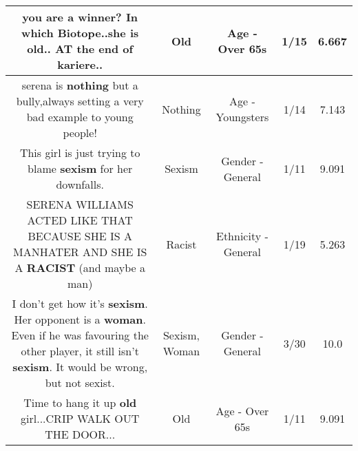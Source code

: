 \documentclass[11pt]{article}
\newlength\mylength
\begin{document}
\begin{center}
\begin{longtable}{|C{.65\mylength}|C{.30\mylength}|C{.12\mylength}|C{.12\mylength}|C{.12\mylength}|}
  \small you are a winner? In which Biotope..she is \textbf{old}.. AT the end of kariere..\normalsize   & Old & Age - Over 65s & 1/15 & 6.667 \\  \hline
  \small serena is \textbf{nothing} but a bully,always setting a very bad example to young people!\normalsize   & Nothing & Age - Youngsters & 1/14 & 7.143 \\  \hline
  \small This girl is just trying to blame \textbf{sexism} for her downfalls.\normalsize   & Sexism & Gender - General & 1/11 & 9.091 \\  \hline
  \small SERENA WILLIAMS ACTED LIKE THAT BECAUSE SHE IS A MANHATER AND SHE IS A \textbf{RACIST}   (and maybe a man)\normalsize   & Racist & Ethnicity - General & 1/19 & 5.263 \\  \hline
  \small I don't get how it's \textbf{sexism}. Her opponent is a \textbf{woman}. Even if he was favouring the other player, it still isn't \textbf{sexism}. It would be wrong,  but not sexist.\normalsize   & Sexism, Woman & Gender - General & 3/30 & 10.0 \\  \hline
  \small Time to hang it up \textbf{old} girl...CRIP WALK OUT THE DOOR...\normalsize   & Old & Age - Over 65s & 1/11 & 9.091 \\  \hline

\end{longtable}
\end{center}
\end{document}
